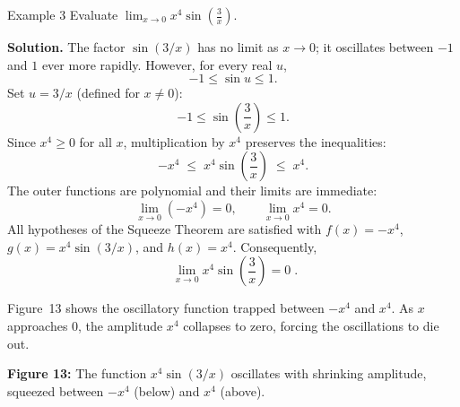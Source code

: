 \begin{examplebox}{Example 3}
Evaluate \(\displaystyle \lim_{x \to 0} x^{4} \sin\!\left(\frac{3}{x}\right)\).

\medskip
\textbf{Solution.}
The factor \(\sin(3/x)\) has no limit as \(x \to 0\); it oscillates between \(-1\) and \(1\) ever more rapidly. However, for every real \(u\),
\[
-1 \leq \sin u \leq 1.
\]
Set \(u = 3/x\) (defined for \(x \neq 0\)):
\[
-1 \leq \sin\!\left(\frac{3}{x}\right) \leq 1.
\]
Since \(x^{4} \geq 0\) for all \(x\), multiplication by \(x^{4}\) preserves the inequalities:
\[
-x^{4}
\;\leq\;
x^{4}\sin\!\left(\frac{3}{x}\right)
\;\leq\;
x^{4}.
\]
The outer functions are polynomial and their limits are immediate:
\[
\lim_{x \to 0}(-x^{4}) = 0,
\qquad
\lim_{x \to 0} x^{4} = 0.
\]
All hypotheses of the Squeeze Theorem are satisfied with \(f(x) = -x^{4}\), \(g(x) = x^{4}\sin(3/x)\), and \(h(x) = x^{4}\). Consequently,
\[
\boxed{\;\lim_{x \to 0} x^{4}\sin\!\left(\frac{3}{x}\right) = 0\;}.
\]
\end{examplebox}

Figure~13 shows the oscillatory function trapped between \(-x^{4}\) and \(x^{4}\). As \(x\) approaches \(0\), the amplitude \(x^{4}\) collapses to zero, forcing the oscillations to die out.

\begin{center}

\smallskip
\textbf{Figure 13:} The function \(x^{4}\sin(3/x)\) oscillates with shrinking amplitude, squeezed between \(-x^{4}\) (below) and \(x^{4}\) (above).
\end{center}

